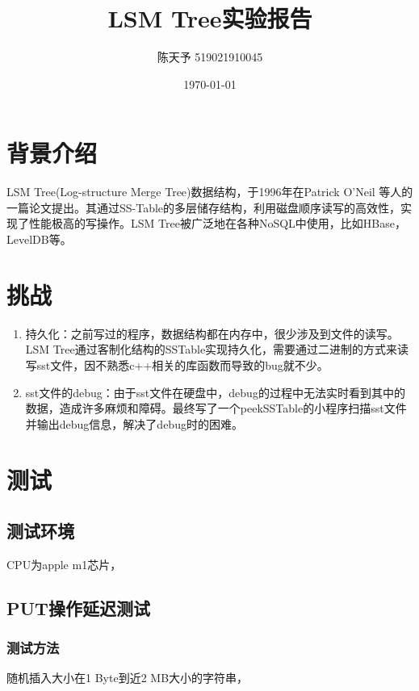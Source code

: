 \documentclass{ctexart}
\title{LSM Tree实验报告}
\author{陈天予 519021910045}
\date{\today}
\begin{document}
\maketitle

\section{背景介绍}
LSM Tree(Log-structure Merge Tree)数据结构，于1996年在Patrick O’Neil 等人的一篇论文提出。其通过SS-Table的多层储存结构，利用磁盘顺序读写的高效性，实现了性能极高的写操作。LSM Tree被广泛地在各种NoSQL中使用，比如HBase，LevelDB等。

\section{挑战}
\begin{enumerate}
  \item 持久化：之前写过的程序，数据结构都在内存中，很少涉及到文件的读写。LSM Tree通过客制化结构的SSTable实现持久化，需要通过二进制的方式来读写sst文件，因不熟悉c++相关的库函数而导致的bug就不少。
  \item sst文件的debug：由于sst文件在硬盘中，debug的过程中无法实时看到其中的数据，造成许多麻烦和障碍。最终写了一个peekSSTable的小程序扫描sst文件并输出debug信息，解决了debug时的困难。
\end{enumerate}

\section{测试}
\subsection{测试环境}
CPU为apple m1芯片，
\subsection{PUT操作延迟测试}
\subsubsection{测试方法}
随机插入大小在1 Byte到近2 MB大小的字符串，
\end{document}
